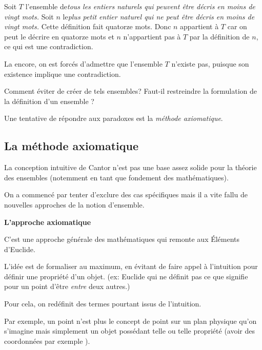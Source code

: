 \documentclass[fleqn,a4paper,nobib]{tufte-handout}
\begin{document}
Soit $T$ l'ensemble de\textit{tous les entiers naturels qui peuvent
être décris en moins de vingt mots.} Soit $n$
le\textit{plus petit entier naturel qui ne peut être décris en moins de vingt mots.}
Cette définition fait quatorze mots. Donc $n$ appartient à $T$ car on peut le décrire
en quatorze mots et $n$ n'appartient pas à $T$ par la définition de $n$, ce qui est
une contradiction.

La encore, on est forcés d'admettre que l'ensemble $T$ n'existe pas,
puisque son existence implique une contradiction.

Comment éviter de créer de tels ensembles? Faut-il restreindre la
formulation de la définition d'un ensemble ? 

Une tentative de répondre aux paradoxes est la \textit{méthode axiomatique}.

\subsection{La méthode axiomatique}

La conception intuitive de Cantor n'est pas une base assez solide
pour la théorie des ensembles (notemment en tant que fondement des
mathématiques).

On a commencé par tenter d'exclure des cas spécifiques
 mais il a
vite fallu de nouvelles approches de la notion d'ensemble.

\textbf{L'approche axiomatique} 

C'est une approche générale des mathématiques qui remonte aux
Éléments d'Euclide.

L'idée est de formaliser au maximum, en évitant de faire appel à
l'intuition pour définir une propriété d'un objet. (ex: Euclide
qui ne définit pas ce que signifie pour un point d'être \textit{entre}
deux autres.)

Pour cela, on redéfinit des termes pourtant issus de l'intuition.

Par exemple, un point n'est plus le concept de point sur un plan
physique qu'on s'imagine mais simplement un objet possédant telle
ou telle propriété (avoir des coordonnées par exemple
).
\end{document}
